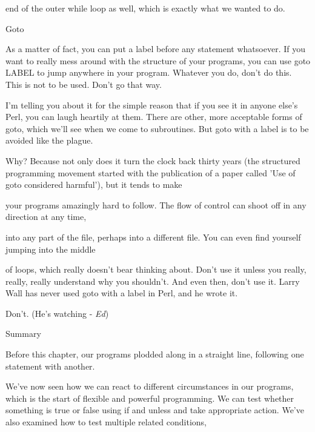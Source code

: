 \documentclass[a4paper,11pt]{book}
\begin{document}
\noindent end of the outer while loop as well, which is exactly what we wanted to do.

\noindent 

\noindent 

\noindent Goto

\noindent 

\noindent As a matter of fact, you can put a label before any statement whatsoever. If you want to really mess around with the structure of your programs, you can use goto LABEL to jump anywhere in your program. Whatever you do, don't do this. This is not to be used. Don't go that way.

\noindent 

\noindent I'm telling you about it for the simple reason that if you see it in anyone else's Perl, you can laugh heartily at them. There are other, more acceptable forms of goto, which we'll see when we come to subroutines. But goto with a label is to be avoided like the plague.

\noindent 

\noindent Why? Because not only does it turn the clock back thirty years (the structured programming movement started with the publication of a paper called 'Use of goto considered harmful'), but it tends to make

\noindent your programs amazingly hard to follow. The flow of control can shoot off in any direction at any time,

\noindent into any part of the file, perhaps into a different file. You can even find yourself jumping into the middle

\noindent of loops, which really doesn't bear thinking about. Don't use it unless you really, really, really understand why you shouldn't. And even then, don't use it. Larry Wall has never used goto with a label in Perl, and he wrote it.

\noindent 

\noindent Don't. (He's watching - \textit{Ed})

\noindent 

\noindent 

\noindent Summary

\noindent 

\noindent Before this chapter, our programs plodded along in a straight line, following one statement with another.

\noindent 

\noindent We've now seen how we can react to different circumstances in our programs, which is the start of flexible and powerful programming. We can test whether something is true or false using if and unless and take appropriate action. We've also examined how to test multiple related conditions,
\end{document}
